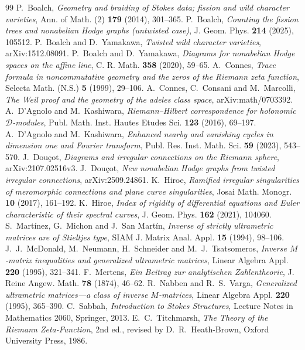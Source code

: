\documentclass[11pt,a4paper]{amsart}
\theoremstyle{plain}
\theoremstyle{definition}
\begin{document}
\begin{thebibliography}{99}
P.~Boalch, \emph{Geometry and braiding of Stokes data; fission and wild character varieties},
Ann. of Math. (2) \textbf{179} (2014), 301--365.
P.~Boalch, \emph{Counting the fission trees and nonabelian Hodge graphs (untwisted case)},
J. Geom. Phys. \textbf{214} (2025), 105512.
P.~Boalch and D.~Yamakawa, \emph{Twisted wild character varieties},
arXiv:1512.08091.
P.~Boalch and D.~Yamakawa, \emph{Diagrams for nonabelian Hodge spaces on the affine line},
C. R. Math. \textbf{358} (2020), 59--65.
A.~Connes, \emph{Trace formula in noncommutative geometry and the zeros of the Riemann zeta
function}, Selecta Math. (N.S.) \textbf{5} (1999), 29--106.
A.~Connes, C.~Consani and M.~Marcolli, \emph{The Weil proof and the geometry of the adeles
class space}, arXiv:math/0703392.
A.~D'Agnolo and M.~Kashiwara, \emph{Riemann--Hilbert correspondence for holonomic
$\mathcal D$-modules}, Publ. Math. Inst. Hautes Etudes Sci. \textbf{123} (2016), 69--197.
A.~D'Agnolo and M.~Kashiwara, \emph{Enhanced nearby and vanishing cycles in dimension one and
Fourier transform}, Publ. Res. Inst. Math. Sci. \textbf{59} (2023), 543--570.
J.~Dou\c{c}ot, \emph{Diagrams and irregular connections on the Riemann sphere},
arXiv:2107.02516v3.
J.~Dou\c{c}ot, \emph{New nonabelian Hodge graphs from twisted irregular connections},
arXiv:2509.24861.
K.~Hiroe, \emph{Ramified irregular singularities of meromorphic connections and plane curve
singularities}, Josai Math. Monogr. \textbf{10} (2017), 161--192.
K.~Hiroe, \emph{Index of rigidity of differential equations and Euler characteristic of their
spectral curves}, J. Geom. Phys. \textbf{162} (2021), 104060.
S.~Mart\'{i}nez, G.~Michon and J.~San Mart\'{i}n, \emph{Inverse of strictly ultrametric matrices
are of Stieltjes type}, SIAM J. Matrix Anal. Appl. \textbf{15} (1994), 98--106.
J.~J.~McDonald, M.~Neumann, H.~Schneider and M.~J.~Tsatsomeros, \emph{Inverse $M$-matrix
inequalities and generalized ultrametric matrices}, Linear Algebra Appl. \textbf{220} (1995),
321--341.
F.~Mertens, \emph{Ein Beitrag zur analytischen Zahlentheorie},
J. Reine Angew. Math. \textbf{78} (1874), 46--62.
R.~Nabben and R.~S.~Varga, \emph{Generalized ultrametric matrices---a class of inverse
$M$-matrices}, Linear Algebra Appl. \textbf{220} (1995), 365--390.
C.~Sabbah, \emph{Introduction to Stokes Structures}, Lecture Notes in Mathematics 2060,
Springer, 2013.
E.~C.~Titchmarsh, \emph{The Theory of the Riemann Zeta-Function}, 2nd ed., revised by
D.~R.~Heath-Brown, Oxford University Press, 1986.
\end{thebibliography}
\end{document}
